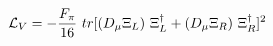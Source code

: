 \begin{equation}
{\cal{L}}_V= -\frac{F_\pi}{16}~tr[(D_\mu \Xi_L)~\Xi_L^\dag + (D_\mu \Xi_R)~\Xi_R^\dag]^2
\end{equation}

